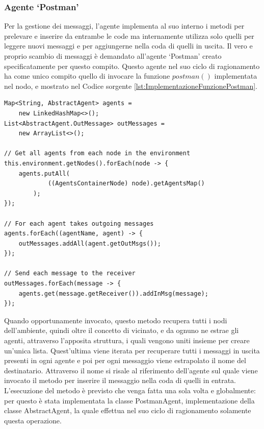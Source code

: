\subsubsection{Agente `Postman'}
Per la gestione dei messaggi, l'agente implementa al suo interno i metodi per prelevare e inserire da entrambe le code ma internamente utilizza solo quelli per leggere nuovi messaggi e per aggiungerne nella coda di quelli in uscita.
Il vero e proprio scambio di messaggi è demandato all'agente `Postman' creato specificatamente per questo compito. Questo agente nel suo ciclo di ragionamento ha come unico compito quello di invocare la funzione $postman()$ implementata nel nodo, e mostrato nel Codice sorgente \ref{lst:ImplementazioneFunzionePostman}.
\medskip
\begin{lstlisting}[firstnumber=1,label={lst:ImplementazioneFunzionePostman},caption={Implementazione funzione Postman}]
Map<String, AbstractAgent> agents =
	new LinkedHashMap<>();
List<AbstractAgent.OutMessage> outMessages =
	new ArrayList<>();

// Get all agents from each node in the environment
this.environment.getNodes().forEach(node -> {
    agents.putAll(
    		((AgentsContainerNode) node).getAgentsMap()
    	);
});

// For each agent takes outgoing messages
agents.forEach((agentName, agent) -> {
    outMessages.addAll(agent.getOutMsgs());
});

// Send each message to the receiver
outMessages.forEach(message -> {
    agents.get(message.getReceiver()).addInMsg(message);
});
\end{lstlisting}

Quando opportunamente invocato, questo metodo recupera tutti i nodi dell'ambiente, quindi oltre il concetto di vicinato, e da ognuno ne estrae gli agenti, attraverso l'apposita struttura, i quali vengono uniti insieme per creare un'unica lista. Quest'ultima viene iterata per recuperare tutti i messaggi in uscita presenti in ogni agente e poi per ogni messaggio viene estrapolato il nome del destinatario. Attraverso il nome si risale al riferimento dell'agente sul quale viene invocato il metodo per inserire il messaggio nella coda di quelli in entrata.
\\
L'esecuzione del metodo è previsto che venga fatta una sola volta e globalmente: per questo è stata implementata la classe PostmanAgent, implementazione della classe AbstractAgent, la quale effettua nel suo ciclo di ragionamento solamente questa operazione.

